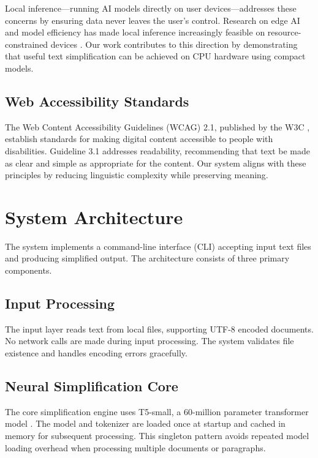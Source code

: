 \documentclass[11pt]{article}
\begin{document}
Local inference---running AI models directly on user devices---addresses these concerns by ensuring data never leaves the user's control. Research on edge AI and model efficiency has made local inference increasingly feasible on resource-constrained devices \citep{shi2016}. Our work contributes to this direction by demonstrating that useful text simplification can be achieved on CPU hardware using compact models.

\subsection{Web Accessibility Standards}

The Web Content Accessibility Guidelines (WCAG) 2.1, published by the W3C \citep{wcag2018}, establish standards for making digital content accessible to people with disabilities. Guideline 3.1 addresses readability, recommending that text be made as clear and simple as appropriate for the content. Our system aligns with these principles by reducing linguistic complexity while preserving meaning.

\section{System Architecture}

The system implements a command-line interface (CLI) accepting input text files and producing simplified output. The architecture consists of three primary components.

\subsection{Input Processing}

The input layer reads text from local files, supporting UTF-8 encoded documents. No network calls are made during input processing. The system validates file existence and handles encoding errors gracefully.

\subsection{Neural Simplification Core}

The core simplification engine uses T5-small, a 60-million parameter transformer model \citep{raffel2020}. The model and tokenizer are loaded once at startup and cached in memory for subsequent processing. This singleton pattern avoids repeated model loading overhead when processing multiple documents or paragraphs.
\end{document}
